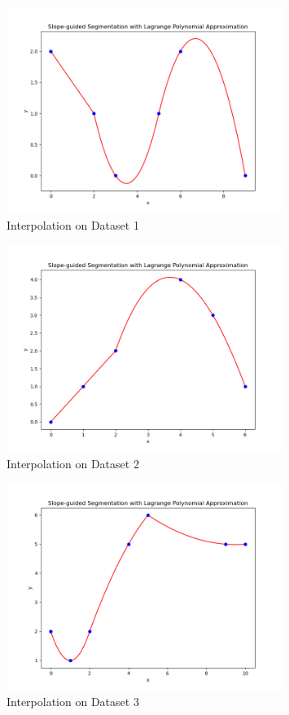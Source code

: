 \documentclass{article}
\begin{document}
\begin{figure}[htbp]
\centering
\includegraphics[width=0.8\textwidth]{test_case_1.png}
\caption{Interpolation on Dataset 1}
\end{figure}

\begin{figure}[htbp]
\centering
\includegraphics[width=0.8\textwidth]{test_case_2.png}
\caption{Interpolation on Dataset 2}
\end{figure}

\begin{figure}[htbp]
\centering
\includegraphics[width=0.8\textwidth]{test_case_3.png}
\caption{Interpolation on Dataset 3}
\end{figure}
\end{document}
